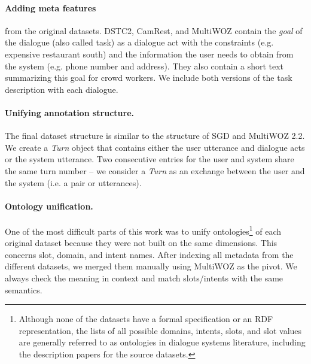 \paragraph{Adding meta features} from the original datasets. DSTC2, CamRest, and MultiWOZ contain the \emph{goal} of the dialogue (also called task) as a dialogue act with the constraints (e.g. expensive restaurant south) and the information the user needs to obtain from the system (e.g. phone number and address). They also contain a short text summarizing this goal for crowd workers. We include both versions of the task description with each dialogue.
    
\paragraph{Unifying annotation structure.} The final dataset structure is similar to the structure of SGD and MultiWOZ 2.2. We create a \textit{Turn} object that contains either the user utterance and dialogue acts or the system utterance.
Two consecutive entries for the user and system share the same turn number -- we consider a \textit{Turn} as an exchange between the user and the system (i.e. a pair or utterances). 

\paragraph{Ontology unification.}   
One of the most difficult parts of this work was to unify ontologies\footnote{Although none of the datasets have a formal specification or an RDF representation, the lists of all possible domains, intents, slots, and slot values are generally referred to as ontologies in dialogue systems literature, including the description papers for the source datasets.} of each original dataset because they were not built on the same dimensions.
This concerns slot, domain, and intent names. After indexing all metadata from the different datasets, we merged them manually using MultiWOZ as the pivot.
We always check the meaning in context and match slots/intents with the same semantics.

